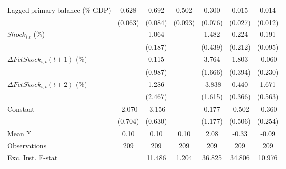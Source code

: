 {\begin{tabular}{l*{6}{c}}
\addlinespace
Lagged primary balance (\% GDP)&       0.628\sym{***}&       0.692\sym{***}&       0.502\sym{***}&       0.300\sym{***}&       0.015         &       0.014         \\
                    &     (0.063)         &     (0.084)         &     (0.093)         &     (0.076)         &     (0.027)         &     (0.012)         \\
\addlinespace
$ Shock_{i,t}$ (\%) &                     &       1.064\sym{***}&                     &       1.482\sym{***}&       0.224         &       0.191\sym{*}  \\
                    &                     &     (0.187)         &                     &     (0.439)         &     (0.212)         &     (0.095)         \\
\addlinespace
$ \Delta FctShock_{i,t}(t+1)$ (\%)&                     &       0.115         &                     &       3.764\sym{**} &       1.803\sym{***}&      -0.060         \\
                    &                     &     (0.987)         &                     &     (1.666)         &     (0.394)         &     (0.230)         \\
\addlinespace
$ \Delta FctShock_{i,t}(t+2)$ (\%)&                     &       1.286         &                     &      -3.838\sym{**} &       0.440         &       1.671\sym{**} \\
                    &                     &     (2.467)         &                     &     (1.615)         &     (0.366)         &     (0.563)         \\
\addlinespace
Constant            &      -2.070\sym{**} &      -3.156\sym{***}&                     &       0.177         &      -0.502         &      -0.360         \\
                    &     (0.704)         &     (0.630)         &                     &     (1.177)         &     (0.506)         &     (0.254)         \\
\midrule
Mean Y              &        0.10         &        0.10         &        0.10         &        2.08         &       -0.33         &       -0.09         \\
Observations        &         209         &         209         &         209         &         209         &         209         &         209         \\
Exc. Inst. F-stat   &                     &      11.486         &       1.204         &      36.825         &      34.806         &      10.976         \\
\bottomrule
\end{tabular}
}

